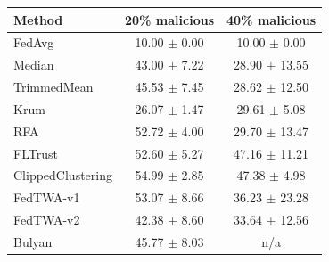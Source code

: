 \begin{tabular}{lcc}
\toprule
Method & 20\% malicious & 40\% malicious \\
\midrule
FedAvg & 10.00 $\pm$ 0.00 & 10.00 $\pm$ 0.00 \\
Median & 43.00 $\pm$ 7.22 & 28.90 $\pm$ 13.55 \\
TrimmedMean & 45.53 $\pm$ 7.45 & 28.62 $\pm$ 12.50 \\
Krum & 26.07 $\pm$ 1.47 & 29.61 $\pm$ 5.08 \\
RFA & 52.72 $\pm$ 4.00 & 29.70 $\pm$ 13.47 \\
FLTrust & 52.60 $\pm$ 5.27 & 47.16 $\pm$ 11.21 \\
ClippedClustering & 54.99 $\pm$ 2.85 & 47.38 $\pm$ 4.98 \\
FedTWA-v1 & 53.07 $\pm$ 8.66 & 36.23 $\pm$ 23.28 \\
FedTWA-v2 & 42.38 $\pm$ 8.60 & 33.64 $\pm$ 12.56 \\
Bulyan & 45.77 $\pm$ 8.03 & n/a \\
\bottomrule
\end{tabular}